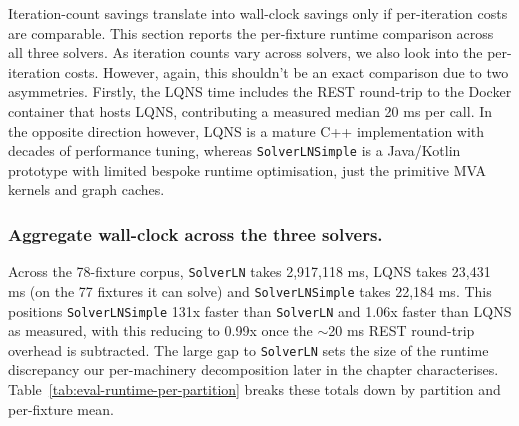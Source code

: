 Iteration-count savings translate into wall-clock savings only if per-iteration costs are comparable. This section reports the per-fixture runtime comparison across all three solvers. As iteration counts vary across solvers, we also look into the per-iteration costs. However, again, this shouldn't be an exact comparison due to two asymmetries. Firstly, the LQNS time includes the REST round-trip to the Docker container that hosts LQNS, contributing a measured median 20 ms per call. In the opposite direction however, LQNS is a mature C++ implementation with decades of performance tuning, whereas \texttt{SolverLNSimple} is a Java/Kotlin prototype with limited bespoke runtime optimisation, just the primitive MVA kernels and graph caches.

\subsubsection*{Aggregate wall-clock across the three solvers.}
Across the 78-fixture corpus, \texttt{SolverLN} takes 2,917,118 ms, LQNS takes 23,431 ms (on the 77 fixtures it can solve) and \texttt{SolverLNSimple} takes 22,184 ms. This positions \texttt{SolverLNSimple} 131x faster than \texttt{SolverLN} and 1.06x faster than LQNS as measured, with this reducing to 0.99x once the $\sim$20 ms REST round-trip overhead is subtracted. The large gap to \texttt{SolverLN} sets the size of the runtime discrepancy our per-machinery decomposition later in the chapter characterises. Table~\ref{tab:eval-runtime-per-partition} breaks these totals down by partition and per-fixture mean.

